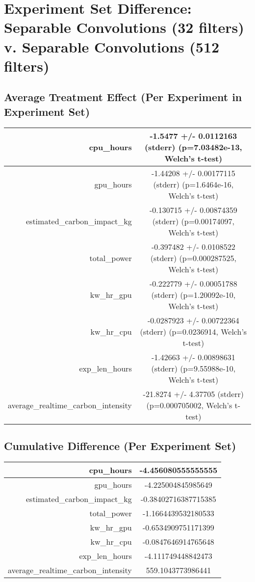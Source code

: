 \documentclass{article}%
\begin{document}
%
\normalsize%
\section{Experiment Set Difference: Separable Convolutions (32 filters) v. Separable Convolutions (512 filters)}%
\label{sec:Experiment Set Difference Separable Convolutions (32 filters) v. Separable Convolutions (512 filters)}%
\subsection{Average Treatment Effect (Per Experiment in Experiment Set)}%
\label{subsec:Average Treatment Effect (Per Experiment in Experiment Set)}%
\begin{tabular}{|r|c|}%
\hline%
cpu\_hours&{-}1.5477 +/{-} 0.0112163 (stderr) (p=7.03482e{-}13, Welch's t{-}test)\\%
\hline%
gpu\_hours&{-}1.44208 +/{-} 0.00177115 (stderr) (p=1.6464e{-}16, Welch's t{-}test)\\%
\hline%
estimated\_carbon\_impact\_kg&{-}0.130715 +/{-} 0.00874359 (stderr) (p=0.00174097, Welch's t{-}test)\\%
\hline%
total\_power&{-}0.397482 +/{-} 0.0108522 (stderr) (p=0.000287525, Welch's t{-}test)\\%
\hline%
kw\_hr\_gpu&{-}0.222779 +/{-} 0.00051788 (stderr) (p=1.20092e{-}10, Welch's t{-}test)\\%
\hline%
kw\_hr\_cpu&{-}0.0287923 +/{-} 0.00722364 (stderr) (p=0.0236914, Welch's t{-}test)\\%
\hline%
exp\_len\_hours&{-}1.42663 +/{-} 0.00898631 (stderr) (p=9.55988e{-}10, Welch's t{-}test)\\%
\hline%
average\_realtime\_carbon\_intensity&{-}21.8274 +/{-} 4.37705 (stderr) (p=0.000705002, Welch's t{-}test)\\%
\hline%
\end{tabular}

%
\subsection{Cumulative Difference (Per Experiment Set)}%
\label{subsec:Cumulative Difference (Per Experiment Set)}%
\begin{tabular}{|r|c|}%
\hline%
cpu\_hours&{-}4.456080555555555\\%
\hline%
gpu\_hours&{-}4.225004845985649\\%
\hline%
estimated\_carbon\_impact\_kg&{-}0.38402716387715385\\%
\hline%
total\_power&{-}1.1664439532180533\\%
\hline%
kw\_hr\_gpu&{-}0.6534909751171399\\%
\hline%
kw\_hr\_cpu&{-}0.0847646914765648\\%
\hline%
exp\_len\_hours&{-}4.111749448842473\\%
\hline%
average\_realtime\_carbon\_intensity&559.1043773986441\\%
\hline%
\end{tabular}

%
\end{document}
